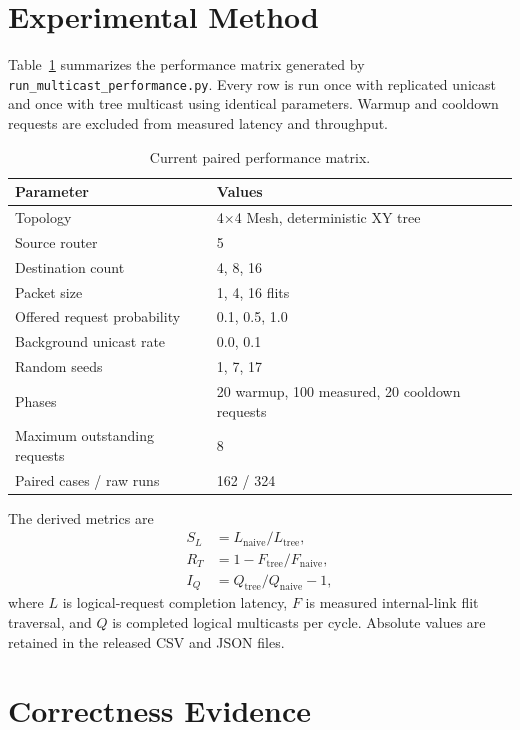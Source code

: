 \documentclass[10pt]{article}
\begin{document}
\section{Experimental Method}

Table~\ref{tab:matrix} summarizes the performance matrix generated by
\texttt{run\_multicast\_performance.py}.  Every row is run once with replicated
unicast and once with tree multicast using identical parameters.  Warmup and
cooldown requests are excluded from measured latency and throughput.

\begin{table}[ht]
\centering
\caption{Current paired performance matrix.}
\label{tab:matrix}
\begin{tabular}{ll}
\toprule
Parameter & Values \\
\midrule
Topology & 4$\times$4 Mesh, deterministic XY tree \\
Source router & 5 \\
Destination count & 4, 8, 16 \\
Packet size & 1, 4, 16 flits \\
Offered request probability & 0.1, 0.5, 1.0 \\
Background unicast rate & 0.0, 0.1 \\
Random seeds & 1, 7, 17 \\
Phases & 20 warmup, 100 measured, 20 cooldown requests \\
Maximum outstanding requests & 8 \\
Paired cases / raw runs & 162 / 324 \\
\bottomrule
\end{tabular}
\end{table}

The derived metrics are
\begin{align*}
S_L &= L_{\mathrm{naive}} / L_{\mathrm{tree}}, \\
R_T &= 1 - F_{\mathrm{tree}} / F_{\mathrm{naive}}, \\
I_Q &= Q_{\mathrm{tree}} / Q_{\mathrm{naive}} - 1,
\end{align*}
where $L$ is logical-request completion latency, $F$ is measured internal-link
flit traversal, and $Q$ is completed logical multicasts per cycle.  Absolute
values are retained in the released CSV and JSON files.

\section{Correctness Evidence}
\end{document}
